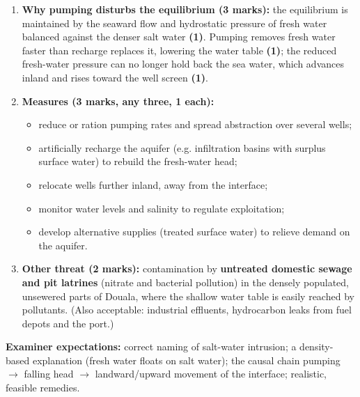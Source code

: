 \documentclass[11pt]{article}
\begin{document}
\begin{corrige}[Exercise 10]
\begin{enumerate}
\item \textbf{Why pumping disturbs the equilibrium (3 marks):} the equilibrium is maintained by the seaward flow and hydrostatic pressure of fresh water balanced against the denser salt water \textbf{(1)}. Pumping removes fresh water faster than recharge replaces it, lowering the water table \textbf{(1)}; the reduced fresh-water pressure can no longer hold back the sea water, which advances inland and rises toward the well screen \textbf{(1)}.
\item \textbf{Measures (3 marks, any three, 1 each):}
\begin{itemize}
\item reduce or ration pumping rates and spread abstraction over several wells;
\item artificially recharge the aquifer (e.g. infiltration basins with surplus surface water) to rebuild the fresh-water head;
\item relocate wells further inland, away from the interface;
\item monitor water levels and salinity to regulate exploitation;
\item develop alternative supplies (treated surface water) to relieve demand on the aquifer.
\end{itemize}
\item \textbf{Other threat (2 marks):} contamination by \textbf{untreated domestic sewage and pit latrines} (nitrate and bacterial pollution) in the densely populated, unsewered parts of Douala, where the shallow water table is easily reached by pollutants. (Also acceptable: industrial effluents, hydrocarbon leaks from fuel depots and the port.)
\end{enumerate}

\textbf{Examiner expectations:} correct naming of salt-water intrusion; a density-based explanation (fresh water floats on salt water); the causal chain pumping $\rightarrow$ falling head $\rightarrow$ landward/upward movement of the interface; realistic, feasible remedies.
\end{corrige}
\end{document}
